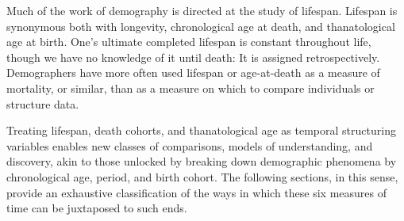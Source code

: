 \documentclass[12pt,oneside,a4paper]{article} %
\begin{document}

Much of the work of demography is directed at the study of lifespan. Lifespan is
synonymous both with longevity, chronological age at death, and thanatological
age at birth. One's ultimate completed lifespan is constant throughout life,
though we have no knowledge of it until death: It is assigned retrospectively.
Demographers have more often used lifespan or age-at-death as a measure of
mortality, or similar, than as a measure on which to compare individuals or
structure data.

Treating lifespan,
death cohorts, and thanatological age as temporal structuring variables
enables new classes of comparisons, models of understanding, and discovery,
akin to those unlocked by breaking down demographic phenomena by chronological age,
period, and birth cohort. The following sections, in this sense, provide an
exhaustive classification of the ways in which these six measures of time can be juxtaposed to such ends.
\end{document}
